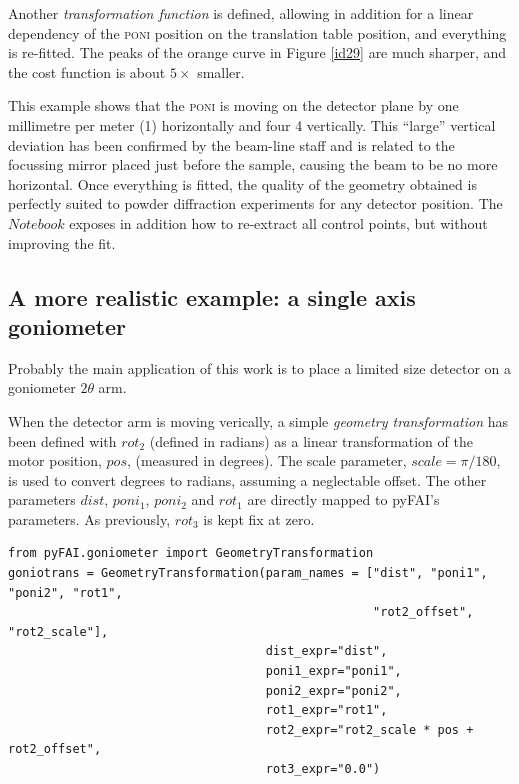 \documentclass[preprint, pdf]{iucr}              %
\begin{document}
 
Another \textit{transformation function} is defined, allowing in
addition for a linear dependency of the \textsc{poni} position on the
translation table position, and everything is re-fitted.
The peaks of the orange curve in Figure \ref{id29} are much sharper, and the cost 
function is about $5\times$ smaller.


This example shows that the \textsc{poni} is moving on the detector
plane by one millimetre per meter (1\textperthousand) horizontally and four
4 \textperthousand vertically.
This ``large'' vertical deviation has been confirmed by the beam-line staff and
is related to the focussing mirror placed just before the sample, causing the
beam to be no more horizontal.
Once everything is fitted, the quality of the geometry obtained is perfectly
suited to powder diffraction experiments for any detector position. The
$Notebook$ exposes in addition how to re-extract all control points, but
without improving the fit. 
  
\subsection{A more realistic example: a single axis goniometer}

Probably the main application of this work is to place a limited size detector
on a goniometer $2\theta$ arm. 

When the detector arm is moving verically, a simple \textit{geometry
transformation} has been defined with $rot_2$ (defined in radians) as a
linear transformation of the motor position, $pos$, (measured in degrees).
The scale parameter, $scale = \pi / 180$, is used to convert degrees to radians, 
assuming a neglectable offset.
The other parameters $dist$, $poni_1$, $poni_2$ and $rot_1$ are directly mapped
to pyFAI's parameters.
As previously, $rot_3$ is kept fix at zero.

\begin{verbatim}
from pyFAI.goniometer import GeometryTransformation
goniotrans = GeometryTransformation(param_names = ["dist", "poni1", "poni2", "rot1",
                                                   "rot2_offset", "rot2_scale"],
                                    dist_expr="dist", 
                                    poni1_expr="poni1",
                                    poni2_expr="poni2", 
                                    rot1_expr="rot1", 
                                    rot2_expr="rot2_scale * pos + rot2_offset", 
                                    rot3_expr="0.0")
\end{verbatim}
\end{document}
